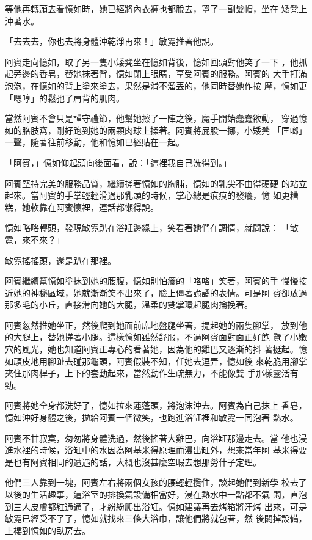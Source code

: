 等他再轉頭去看憶如時，她已經將內衣褲也都脫去，罩了一副髮帽，坐在
矮凳上沖著水。

「去去去，你也去將身體沖乾淨再來！」敏霓推著他說。

阿賓走向憶如，取了另一隻小矮凳坐在憶如背後，憶如回頭對他笑了一下
，他抓起旁邊的香皂，替她抹著背，憶如閉上眼睛，享受阿賓的服務。阿賓的
大手打滿泡泡，在憶如的背上塗來塗去，果然是滑不溜丟的，他同時替她作按
摩，憶如更「嗯哼」的鬆弛了肩背的肌肉。

當然阿賓不會只是謹守禮節，他幫她擦了一陣之後，魔手開始蠢蠢欲動，
穿過憶如的胳肢窩，剛好跑到她的兩顆肉球上揉著。阿賓將屁股一挪，小矮凳
「匡啷」一聲，隨著往前移動，他和憶如已經貼在一起。

「阿賓，」憶如仰起頭向後面看，說：「這裡我自己洗得到。」

阿賓堅持完美的服務品質，繼續搓著憶如的胸脯，憶如的乳尖不由得硬硬
的站立起來。當阿賓的手掌輕輕滑過那乳頭的時候，掌心總是痕痕的發癢，憶
如更糟糕，她軟靠在阿賓懷裡，連話都懶得說。

憶如略略轉頭，發現敏霓趴在浴缸邊緣上，笑看著她們在調情，就問說：
「敏霓，來不來？」

敏霓搖搖頭，還是趴在那裡。

阿賓繼續幫憶如塗抹到她的腰腹，憶如則怕癢的「咯咯」笑著，阿賓的手
慢慢接近她的神秘區域，她就漸漸笑不出來了，臉上僵著詭譎的表情。可是阿
賓卻放過那多毛的小丘，直接滑向她的大腿，溫柔的雙掌環起腿肉掄挽著。

阿賓忽然推她坐正，然後爬到她面前席地盤腿坐著，提起她的兩隻腳掌，
放到他的大腿上，替她搓著小腿。這樣憶如雖然舒服，不過阿賓面對面正好飽
覽了小嫩穴的風光，她也知道阿賓正專心的看著她，因為他的雞巴又逐漸的抖
著挺起。憶如頑皮地用腳趾去碰那龜頭，阿賓假裝不知，任她去逗弄，憶如後
來乾脆用腳掌夾住那肉桿子，上下的套動起來，當然動作生疏無力，不能像雙
手那樣靈活有勁。

阿賓將她全身都洗好了，憶如拉來蓮蓬頭，將泡沫沖去。阿賓為自己抹上
香皂，憶如沖好身體之後，拋給阿賓一個微笑，也跑進浴缸裡和敏霓一同泡著
熱水。

阿賓不甘寂寞，匆匆將身體洗過，然後搖著大雞巴，向浴缸那邊走去。當
他也浸進水裡的時候，浴缸中的水因為阿基米得原理而漫出缸外，想來當年阿
基米得要是也有阿賓相同的遭遇的話，大概也沒甚麼空暇去想那勞什子定理。

他們三人靠到一塊，阿賓左右將兩個女孩的腰輕輕攬住，談起她們到新學
校去了以後的生活趣事，這浴室的排換氣設備相當好，浸在熱水中一點都不氣
悶，直泡到三人皮膚都紅通通了，才紛紛爬出浴缸。憶如建議再去烤箱將汗烤
出來，可是敏霓已經受不了了，憶如就找來三條大浴巾，讓他們將就包著，然
後關掉設備，上樓到憶如的臥房去。

